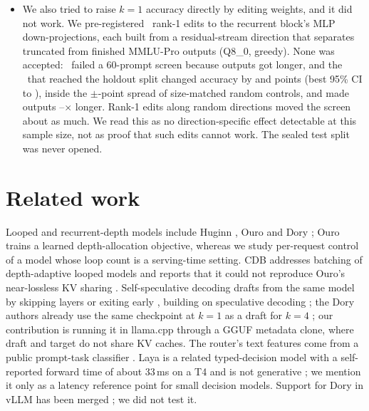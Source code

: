 \documentclass[11pt]{article}
\makeatletter
\def\sg@aux#1#2\relax{\if#1-$-$#2\else\if#1+{+}#2\else{+}#1#2\fi\fi}
\newcommand{\sg}[1]{\expandafter\sg@aux#1\relax}
\newcommand{\LayaMs}{33}%
\makeatother
\begin{document}
\begin{itemize}
\item We also tried to raise $k{=}1$ accuracy directly by editing weights, and it did not work. We pre-registered \WspEdits\ rank-1 edits to the recurrent block's MLP down-projections, each built from a residual-stream direction that separates truncated from finished MMLU-Pro outputs (Q8\_0, greedy). None was accepted: \WspScreenRejects\ failed a 60-prompt screen because outputs got longer, and the \WspHoldoutTested\ that reached the holdout split changed accuracy by \sg{\WspWorstDacc} and \sg{\WspBestDacc} points (best 95\% CI \sg{\WspBestDaccLo} to \sg{\WspBestDaccHi}), inside the $\pm$\WspCtrlAbsMax-point spread of size-matched random controls, and made outputs \WspTokRatioMin--\WspTokRatioMax$\times$ longer. Rank-1 edits along random directions moved the screen about as much. We read this as no direction-specific effect detectable at this sample size, not as proof that such edits cannot work. The sealed test split was never opened.
\end{itemize}

\section{Related work}
Looped and recurrent-depth models include Huginn \citep{huginn2025}, Ouro \citep{ouro2025} and Dory \citep{dory2026}; Ouro trains a learned depth-allocation objective, whereas we study per-request control of a model whose loop count is a serving-time setting. CDB addresses batching of depth-adaptive looped models and reports that it could not reproduce Ouro's near-lossless KV sharing \citep{cdb2026}. Self-speculative decoding drafts from the same model by skipping layers or exiting early \citep{draftverify2024,layerskip2024}, building on speculative decoding \citep{leviathan2023}; the Dory authors already use the same checkpoint at $k{=}1$ as a draft for $k{=}4$ \citep[Sec.~6.2]{dory2026}; our contribution is running it in llama.cpp through a GGUF metadata clone, where draft and target do not share KV caches. The router's text features come from a public prompt-task classifier \citep{nvclassifier}. Laya is a related typed-decision model with a self-reported forward time of about \LayaMs\,ms on a T4 and is not generative \citep{laya}; we mention it only as a latency reference point for small decision models. Support for Dory in vLLM has been merged \citep{vllm60149}; we did not test it.
\end{document}
